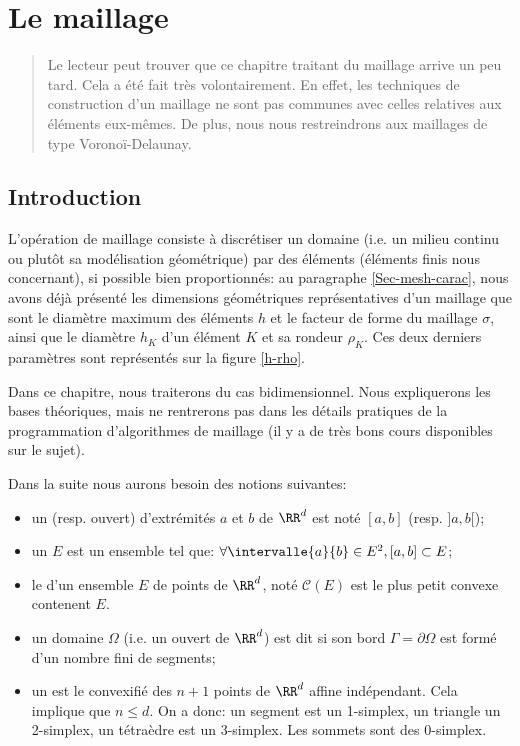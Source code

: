 \chapter{Le maillage}\label{Ch-mesh}
\begin{abstract}
Le lecteur peut trouver que ce chapitre traitant du maillage arrive un peu tard.
Cela a été fait très volontairement. En effet, les techniques de construction d'un maillage ne sont pas communes
avec celles relatives aux éléments eux-mêmes.
De plus, nous nous restreindrons aux maillages de type Voronoï-Delaunay.
\end{abstract}

\medskip
\section{Introduction}

L'opération de maillage consiste à discrétiser un domaine (i.e. un milieu continu ou plutôt sa modélisation géométrique) par des éléments 
(éléments finis nous concernant), si possible bien proportionnés: 
au paragraphe \ref{Sec-mesh-carac}, nous avons déjà présenté les dimensions géométriques représentatives d'un maillage que sont 
le diamètre maximum des éléments $h$ et le facteur de forme du maillage 
$\sigma$, ainsi que le diamètre $h_K$ d'un élément $K$ et sa rondeur $\rho_K$.
Ces deux derniers paramètres sont représentés sur la figure \ref{h-rho}. 

\medskip
Dans ce chapitre, nous traiterons du cas bidimensionnel.
Nous expliquerons les bases théoriques, mais ne rentrerons pas dans les détails pratiques de la programmation
d'algorithmes de maillage (il y a de très bons cours disponibles sur le sujet).

\medskip
Dans la suite nous aurons besoin des notions suivantes:
\begin{itemize}
   \item un  (resp. ouvert) d'extrémités $a$ et $b$ de $\RR^d$ est noté $[a,b]$ (resp. $]a,b[$);
   \item un  $E$ est un ensemble tel que: $\forall \intervalle{a}{b}\in E^2, [a,b]\subset E$;
   \item le  d'un ensemble $E$ de points de $\RR^d$, noté $\mathcal{C}(E)$ est le plus petit convexe
	contenent $E$.
   \item un domaine $\Omega$ (i.e. un ouvert de $\RR^d$) est dit  si son bord $\Gamma=\partial\Omega$
	est formé d'un nombre fini de segments;
   \item un  est le convexifié des $n+1$ points de $\RR^d$ affine indépendant.
	Cela implique que $n\le d$. On a donc: un segment est un 1-simplex, un triangle un 2-simplex, un tétraèdre est un 3-simplex.
	Les sommets sont des 0-simplex.
\end{itemize}


